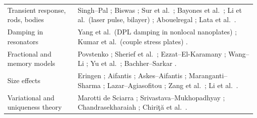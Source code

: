 \begin{table}[t]
\begin{tabularx}{\textwidth}{@{}p{3.2cm}X@{}}
Transient response, rods, bodies & Singh--Pal \citep{Singh2019,Singh2020a}; Biswas \citep{Biswas2019}; Sur et al.\ \citep{Sur2019,Sur2025}; Bayones et al.\ \citep{Bayones2021}; Li et al.\ (laser pulse, bilayer) \citep{Li2019}; Abouelregal \citep{Abouelregal2023,Abouelregal2020,Abouelregal2020a}; Lata et al.\ \citep{Lata2020}.\\
Damping in resonators & Yang et al.\ (DPL damping in nonlocal nanoplates) \citep{Yang2021}; Kumar et al.\ (couple stress plates) \citep{Kumar2017}.\\
Fractional and memory models & Povstenko \citep{Povstenko2004,Povstenko2009,Povstenko2011Cattaneo,Povstenko2016}; Sherief et al.\ \citep{Sherief2010Fractional}; Ezzat--El-Karamany \citep{Ezzat2011}; Wang--Li \citep{Wang2011,Wang2021,WangLi2025IV}; Yu et al.\ \citep{Yu2024}; Bachher--Sarkar \citep{Bachher2019}.\\
Size effects & Eringen \citep{Eringen1972,Eringen1983}; Aifantis \citep{Aifantis1992}; Askes--Aifantis \citep{Askes2006,Askes2011}; Maranganti--Sharma \citep{Maranganti2006,Maranganti2007}; Lazar--Agiasofitou \citep{Lazar2022}; Zang et al.\ \citep{Zang2014}; Li et al.\ \citep{Li2018}.\\
Variational and uniqueness theory & Marotti de Sciarra \citep{Marotti2013}; Srivastava--Mukhopadhyay \citep{Srivastava2026}; Chandrasekharaiah \citep{Chandrasekharaiah1996}; Chiri\c{t}\u{a} et al.\ \citep{Chirita2016,Tibullo2017}.\\
\bottomrule\end{tabularx}
\end{table}

